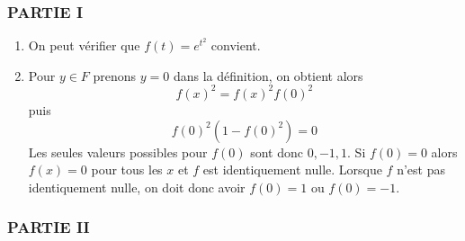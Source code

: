 \subsubsection*{PARTIE I}

\begin{enumerate}
\item  On peut v{\'e}rifier que $f(t)=e^{t^{2}}$ convient$.$

\item  Pour $y\in F$ prenons $y=0$ dans la d{\'e}finition, on obtient alors 
\begin{displaymath}
f(x)^{2}=f(x)^{2}f(0)^{2}
\end{displaymath}
puis
\begin{displaymath}
f(0)^{2}(1-f(0)^{2})=0
\end{displaymath}
Les seules valeurs possibles pour
$f(0)$ sont donc $0,-1,1$.\newline
Si $f(0)=0$ alors $f(x)=0$ pour tous les $x$ et $f$ est identiquement nulle. Lorsque $f$ n'est pas
identiquement nulle, on doit donc avoir $f(0)=1$ ou $f(0)=-1$.
\end{enumerate}

\subsubsection*{PARTIE II}

